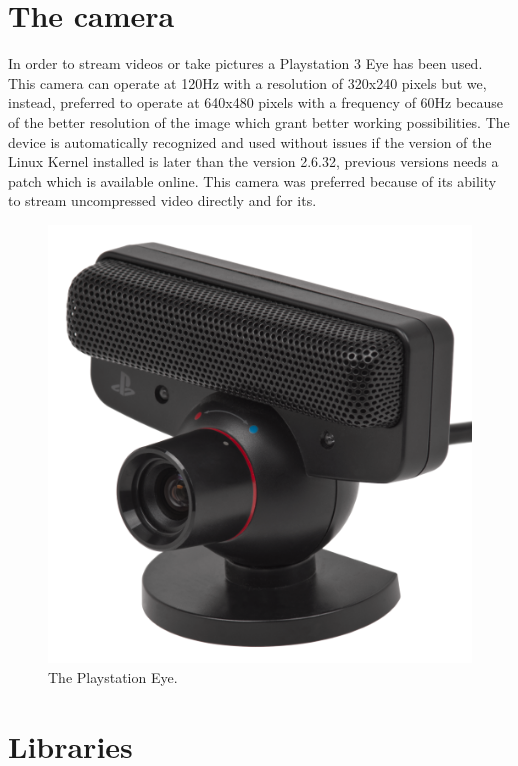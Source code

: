 \section{The camera}
In order to stream videos or take pictures a Playstation 3 Eye has been used.
This camera can operate at 120Hz with a resolution of 320x240 pixels but we, instead, preferred to operate at 640x480 pixels with a frequency of 60Hz because of the better resolution of the image which grant better working possibilities. The device is automatically recognized and used without issues if the version of the Linux Kernel installed is later than the version 2.6.32, previous versions needs a patch which is available online.
This camera was preferred because of its ability to stream uncompressed video directly \cite{pseyecompr} and for its.

\begin{figure}[hbt]
    \centering
    \includegraphics{img/pseye.png}
    \caption{The Playstation Eye.}
\end{figure}
 
\newpage
\section{Libraries}

